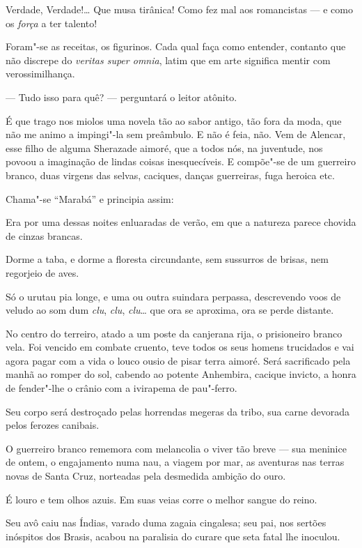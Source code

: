 Verdade, Verdade!\ldots{} Que musa tirânica! Como fez mal aos romancistas ---
e como os \emph{força} a ter talento!

Foram"-se as receitas, os figurinos. Cada qual faça como entender,
contanto que não discrepe do \emph{veritas super omnia}, latim que em
arte significa mentir com verossimilhança.

--- Tudo isso para quê? --- perguntará o leitor atônito.

É que trago nos miolos uma novela tão ao sabor antigo, tão fora da moda,
que não me animo a impingi"-la sem preâmbulo. E não é feia, não. Vem de
Alencar, esse filho de alguma Sherazade aimoré, que a todos nós, na
juventude, nos povoou a imaginação de lindas coisas inesquecíveis. E
compõe"-se de um guerreiro branco, duas virgens das selvas, caciques,
danças guerreiras, fuga heroica etc.

Chama"-se ``Marabá'' e principia assim:

Era por uma dessas noites enluaradas de verão, em que a natureza parece
chovida de cinzas brancas.

Dorme a taba, e dorme a floresta circundante, sem sussurros de brisas,
nem regorjeio de aves.

Só o urutau pia longe, e uma ou outra suindara perpassa, descrevendo
voos de veludo ao som dum \emph{clu}, \emph{clu}, \emph{clu}\ldots{} que ora
se aproxima, ora se perde distante.

No centro do terreiro, atado a um poste da canjerana rija, o prisioneiro
branco vela. Foi vencido em combate cruento, teve todos os seus homens
trucidados e vai agora pagar com a vida o louco ousio de pisar terra
aimoré. Será sacrificado pela manhã ao romper do sol, cabendo ao potente
Anhembira, cacique invicto, a honra de fender"-lhe o crânio com a
ivirapema de pau"-ferro.

Seu corpo será destroçado pelas horrendas megeras da tribo, sua carne
devorada pelos ferozes canibais.

O guerreiro branco rememora com melancolia o viver tão breve --- sua
meninice de ontem, o engajamento numa nau, a viagem por mar, as
aventuras nas terras novas de Santa Cruz, norteadas pela desmedida
ambição do ouro.

É louro e tem olhos azuis. Em suas veias corre o melhor sangue do reino.

Seu avô caiu nas Índias, varado duma zagaia cingalesa; seu pai, nos
sertões inóspitos dos Brasis, acabou na paralisia do curare que seta
fatal lhe inoculou.

